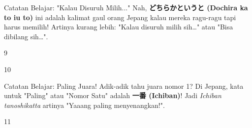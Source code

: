 \begin{lessonbox}{Catatan Belajar: "Kalau Disuruh Milih..."}
    Nah, \textbf{どちらかというと (Dochira ka to iu to)} ini adalah kalimat gaul orang Jepang kalau mereka ragu-ragu tapi harus memilih! Artinya kurang lebih: "Kalau disuruh milih sih\dots" atau "Bisa dibilang sih\dots".
\end{lessonbox}

\begin{convobox}{9}
    \noindent
      
     

    \vspace{1.5em}
\end{convobox}

\begin{convobox}{10}
    \noindent
      
      
      
     

    \vspace{1.5em}
\end{convobox}

\begin{lessonbox}{Catatan Belajar: Paling Juara!}
    Adik-adik tahu juara nomor 1? Di Jepang, kata untuk "Paling" atau "Nomor Satu" adalah \textbf{一番 (Ichiban)}! Jadi \textit{Ichiban tanoshikatta} artinya "Yaaang paling menyenangkan!".
\end{lessonbox}

\begin{convobox}{11}
    \noindent
      
      
     

    \vspace{1.5em}
\end{convobox}

